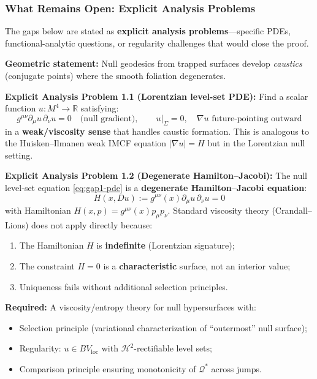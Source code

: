 \subsubsection{What Remains Open: Explicit Analysis Problems}

The gaps below are stated as \textbf{explicit analysis problems}---specific PDEs, functional-analytic questions, or regularity challenges that would close the proof.

\begin{remark}
\textbf{Geometric statement:} Null geodesics from trapped surfaces develop \emph{caustics} (conjugate points) where the smooth foliation degenerates.

\textbf{Explicit Analysis Problem 1.1 (Lorentzian level-set PDE):} 
Find a scalar function $u: M^4 \to \mathbb{R}$ satisfying:
\begin{equation}
\label{eq:gap1-pde}
g^{\mu\nu}\partial_\mu u \,\partial_\nu u = 0 \quad \text{(null gradient)}, \qquad u|_\Sigma = 0, \quad \nabla u \text{ future-pointing outward}
\end{equation}
in a \textbf{weak/viscosity sense} that handles caustic formation. This is analogous to the Huisken--Ilmanen weak IMCF equation $|\nabla u| = H$ but in the Lorentzian null setting.

\textbf{Explicit Analysis Problem 1.2 (Degenerate Hamilton--Jacobi):}
The null level-set equation \eqref{eq:gap1-pde} is a \textbf{degenerate Hamilton--Jacobi equation}:
$$H(x, Du) := g^{\mu\nu}(x) \partial_\mu u \,\partial_\nu u = 0$$
with Hamiltonian $H(x, p) = g^{\mu\nu}(x) p_\mu p_\nu$. Standard viscosity theory (Crandall--Lions) does not apply directly because:
\begin{enumerate}[label=(\roman*)]
\item The Hamiltonian $H$ is \textbf{indefinite} (Lorentzian signature);
\item The constraint $H = 0$ is a \textbf{characteristic} surface, not an interior value;
\item Uniqueness fails without additional selection principles.
\end{enumerate}
\textbf{Required:} A viscosity/entropy theory for null hypersurfaces with:
\begin{itemize}
\item Selection principle (variational characterization of ``outermost'' null surface);
\item Regularity: $u \in BV_{\mathrm{loc}}$ with $\mathcal{H}^2$-rectifiable level sets;
\item Comparison principle ensuring monotonicity of $\mathcal{Q}^*$ across jumps.
\end{itemize}


\end{remark}
